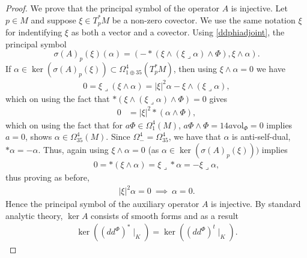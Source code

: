 \documentclass[10pt,a4paper,reqno]{article}
\theoremstyle{definition}
\numberwithin{equation}{section}
\newcommand{\vol}{\mathrm{vol}}
\def\ddphi{dd^{\Phi}}
\begin{document}
\begin{proof}
We prove that the principal symbol of the operator $A$ is injective. Let $p\in M$ and suppose $\xi\in T^*_pM$ be a non-zero covector. We use the same notation $\xi$ for indentifying $\xi$ as both a vector and a covector. Using \cref{ddphiadjoint}, the principal symbol $$\sigma(A)_p(\xi)(\alpha)=\left(-*(\xi\wedge(\xi\lrcorner \alpha)\wedge \Phi), \xi\wedge \alpha \right).$$If $\alpha\in \ker(\sigma(A)_p(\xi))\subset \Omega^4_{1\oplus 35}(T^*_pM)$, then using $\xi\wedge \alpha=0$ we have
\begin{align*}
0=\xi\lrcorner(\xi \wedge \alpha) = |\xi|^2\alpha - \xi\wedge(\xi\lrcorner \alpha),
\end{align*}
which on using the fact that $*(\xi\wedge(\xi\lrcorner \alpha)\wedge \Phi)=0$ gives
\begin{align*}
0&= |\xi|^2*(\alpha \wedge \Phi),
\end{align*}
which on using the fact that for $a\Phi\in \Omega^4_1(M)$, $a\Phi\wedge \Phi=14a\vol_{\Phi}=0$ implies $a=0$, shows $\alpha \in \Omega^4_{35}(M)$. Since $\Omega^4_{-}=\Omega^4_{35}$, we have that $\alpha$ is anti-self-dual, $*\alpha=-\alpha$. Thus, again using $\xi\wedge \alpha=0$ (as $\alpha \in \ker(\sigma(A)_p(\xi)))$ implies
\begin{align*}
0=*(\xi\wedge \alpha)=\xi\lrcorner *\alpha = -\xi \lrcorner \alpha,
\end{align*}
thus proving as before,
\begin{align*}
|\xi|^2\alpha=0\ \implies\ \alpha=0.
\end{align*}
Hence the principal symbol of the auxiliary operator $A$ is injective. By standard analytic theory, $\ker A$ consists of smooth forms and as a result
\begin{align*}
\ker \left((\ddphi)^*\mid_{K} \right)=\ker \left((\ddphi)^t\mid_{K} \right).
\end{align*}

\medskip


\end{proof}
\end{document}
